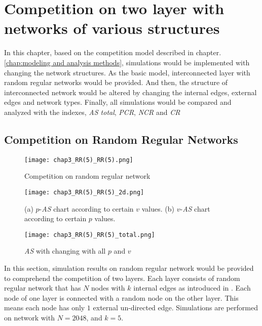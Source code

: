 

\chapter{Competition on two layer with networks of various structures}
\label{chap:competition on two layer with networks of various structures}
In this chapter, based on the competition model described in chapter.\ref{chap:modeling and analysis methods}, simulations would be implemented with changing the network structures. As the basic model, interconnected layer with random regular networks would be provided. And then, the structure of interconnected network  would be altered by changing the internal edges, external edges and network types. Finally, all simulations would be compared and analyzed with the indexes, \textit{AS total}, \textit{PCR}, \textit{NCR} and \textit{CR}

\section{Competition on Random Regular Networks}
\label{competition on Random Regular Networks}
\begin{figure}[!h]
	\centering
	\texttt{[image: chap3\_RR(5)\_RR(5).png]}
	\caption{Competition on random regular network}
	\label{chap3_RR(5)_RR(5)}
\end{figure}
\begin{figure}[!h]
	\centering
	\texttt{[image: chap3\_RR(5)\_RR(5)\_2d.png]}
	\caption{(a) $p$-\textit{AS} chart according to certain $v$ values. (b) $v$-\textit{AS} chart according to certain $p$ values.}
	\label{chap3_RR(5)_RR(5)_2d}
\end{figure}
\begin{figure}[!h]
	\centering
	\texttt{[image: chap3\_RR(5)\_RR(5)\_total.png]}
	\caption{\textit{AS} with changing with all $p$ and $v$}
	\label{chap3_RR(5)_RR(5)_total}
\end{figure}
In this section, simulation results on random regular network would be provided to comprehend the competition of two layers. Each layer consists of random regular network that has $N$ nodes with $k$ internal edges as introduced in \parencite{kimsangwoo2012, choi2011, bela2001}. Each node of one layer is connected with a random node on the other layer. This means each node has only $1$ external un-directed edge. Simulations are performed on network with $N=2048$, and $k = 5$. 

